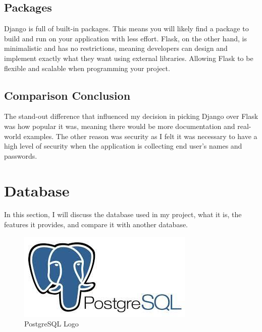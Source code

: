 \subsection{Packages}
Django is full of built-in packages. This means you will likely find a package to build and run on your application with less effort. Flask, on the other hand, is minimalistic and has no restrictions, meaning developers can design and implement exactly what they want using external libraries. Allowing Flask to be flexible and scalable when programming your project. 
\subsection{Comparison Conclusion}
The stand-out difference that influenced my decision in picking Django over Flask was how popular it was, meaning there would be more documentation and real-world examples. The other reason was security as I felt it was necessary to have a high level of security when the application is collecting end user's names and passwords.

\section{Database}
In this section, I will discuss the database used in my project, what it is, the features it provides, and compare it with another database.

\begin{figure}[h]
\centering
\includegraphics[scale=0.4]{img/postgreSQL.jpg}
\caption{PostgreSQL Logo}
\label{PostgreSQL}
\end{figure}


